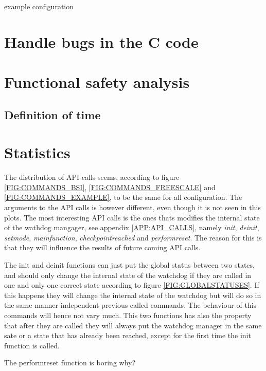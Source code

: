 \begin{table}[!h]
  \caption{example configuration}
  \label{TABLE:STATUSES_EXAMPLE}
  
\end{table}

\section{Handle bugs in the C code}
\label{sec:handlebugs}

\section{Functional safety analysis}
\subsection{Definition of time}
\label{SEC:FUNCTIONAL_SAFETY_TIME}

\section{Statistics}
The distribution of API-calls seems, according to figure
\ref{FIG:COMMANDS_BSI}, \ref{FIG:COMMANDS_FREESCALE} and 
\ref{FIG:COMMANDS_EXAMPLE}, to be the same for all configuration. The arguments
to the API calls is however different, even though it is not seen in this plots.
The most interesting API calls is the ones thats modifies the internal state of
the wathdog mangager, see appendix \ref{APP:API_CALLS}, namely \emph{init},
\emph{deinit}, \emph{setmode}, \emph{mainfunction},
\emph{checkpointreached} and \emph{performreset}. The reason for this is that 
they will influence the results of future coming API calls.

The init and deinit functions can just put the global
status between two states, and should only change the internal state of the
watchdog if they are called in one and only one correct state according to
figure \ref{FIG:GLOBALSTATUSES}. If this happens they will change the internal
state of the watchdog but will do so in the same manner independent previous
called commands. The behaviour of this commands will hence not vary much. 
This two functions has also the property that after they are called they will
always put the watchdog manager in the same sate or a state that has already
been reached, except for the first time the init function is called.   

The performreset function is boring why?

